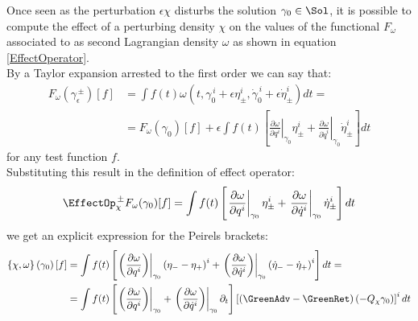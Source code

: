 \documentclass[Main]{subfiles}
\begin{document}
		Once seen as the perturbation $\epsilon \chi$ disturbs the solution $\gamma_0 \in \Sol$, it is possible to compute the effect of a perturbing density $\chi$ on the values of the functional $F_\omega$ associated to as second Lagrangian density $\omega$ as shown in equation \ref{EffectOperator}.\\
		By a Taylor expansion arrested to the first order we can say that:
		\begin{align*}
			F_\omega \left( \gamma_\epsilon^{\, \pm} \right) [f]&= \int f(t) 
			\omega( t, \gamma_0^{\, i} + \epsilon \eta^i_\pm , \dot{\gamma}_0^{\, i} + \epsilon \dot{\eta}_\pm^i ) dt = \\
			& = 
			F_\omega (\gamma_0) [f] + \epsilon \int f(t) \left[ 
			\left. \frac{\partial\omega}{\partial q^i}\right\vert_{\gamma_0} \eta^i_\pm +
			\left. \frac{\partial\omega}{\partial \dot{q}^i}\right\vert_{\gamma_0} \dot{\eta}^i_\pm 
			 \right] dt
		\end{align*}
		for any test function $f$.\\
		Substituting this result in the definition of effect operator:
		\begin{displaymath}
			\EffectOp_\chi^{\, \pm} F_\omega ( \gamma_0) [f] = \int f(t) \left[ 
			\left. \frac{\partial\omega}{\partial q^i}\right\vert_{\gamma_0} \eta^i_\pm +
			\left. \frac{\partial\omega}{\partial \dot{q}^i}\right\vert_{\gamma_0} \dot{\eta}^i_\pm 
			 \right] dt
		\end{displaymath}
		we get an explicit expression for the Peirels brackets:
		\begin{align}\label{EspressionePeierlsCampiCurve}
			\left\lbrace \chi , \omega \right\rbrace \left( \gamma_0 \right) [f] &=
			\int f(t) \left[ 
			\left.\left( \frac{\partial\omega}{\partial q^i}\right)\right\vert_{\gamma_0} \left( \eta_- - \eta_+\right)^i +
			\left.\left( \frac{\partial\omega}{\partial \dot{q}^i}\right)\right\vert_{\gamma_0} \left( \dot{\eta}_- - \dot{\eta}_+\right)^i 
			 \right] dt = \nonumber\\
			 &= \int f(t) 
			 \left[  
				\left.\left( \frac{\partial\omega}{\partial q^i}\right)\right\vert_{\gamma_0} +
				\left.\left( \frac{\partial\omega}{\partial \dot{q}^i}\right)\right\vert_{\gamma_0} \partial_t
			\right]
			\left[
				\left( \GreenAdv - \GreenRet \right)\left( - Q_\chi \gamma_0 \right)
			\right]^i				dt
		\end{align}
			
		
	 
	 	
\end{document}
